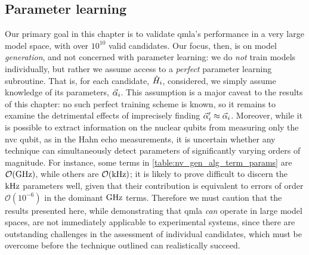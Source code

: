 \subsection{Parameter learning}
Our primary goal in this chapter is to validate \gls{qmla}'s performance in a 
    very large \gls{model space}, with over $10^{10}$ valid candidates. 
Our focus, then, is on model \emph{generation}, and not concerned with parameter learning:
    we do \emph{not} train models individually, but rather we assume access to a \emph{perfect} parameter learning subroutine.
That is, for each candidate, $\hat{H}_i$, considered, we simply assume knowledge of its parameters, $\vec{\alpha}_i$. 
This assumption is a major caveat to the results of this chapter: 
    no such perfect training scheme is known, 
    so it remains to examine the detrimental effects of imprecisely finding $\vec{\alpha}^{\prime}_i \approx \vec{\alpha}_i$. 
Moreover, while it is possible to extract information on the nuclear qubits from measuring only the 
    \gls{nvc} qubit, as in the Hahn echo measurements, 
    it is uncertain whether any technique can simultaneously detect parameters of significantly varying orders of magnitude.
For instance, some terms in \cref{table:nv_gen_alg_term_params} are $\mathcal{O}(\textrm{GHz})$, 
    while others are $\mathcal{O}(\textrm{kHz})$;
    it is likely to prove difficult to discern the $\textrm{kHz}$ parameters well, given that their contribution is equivalent 
    to errors of order $\mathcal{O}(10^{-6})$ in the dominant $\textrm{GHz}$ terms. 
Therefore we must caution that the results presented here, 
    while demonstrating that \gls{qmla} \emph{can} operate in large model spaces, 
    are not immediately applicable to experimental systems, 
    since there are outstanding challenges in the assessment of individual candidates, 
    which must be overcome before the technique outlined can realistically succeed. 



